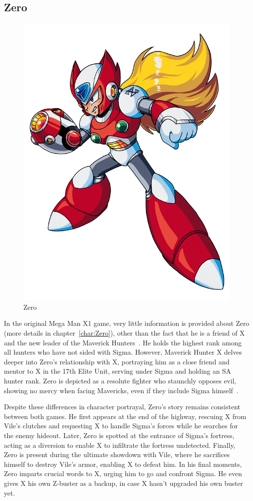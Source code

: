 \subsection{Zero}
\begin{figure}[htp]
	\centering
	\includegraphics[width=0.3\linewidth]{figures/X1/Zero_X1.png}
	\caption{Zero}
\end{figure}

In the original Mega Man X1 game, very little information is provided about Zero (more details in chapter~\ref{char:Zero}), other than the fact that he is a friend of X and the new leader of the Maverick Hunters~\cite{X:Manual}. He holds the highest rank among all hunters who have not sided with Sigma. However, Maverick Hunter X delves deeper into Zero's relationship with X, portraying him as a close friend and mentor to X in the 17th Elite Unit, serving under Sigma and holding an SA hunter rank. Zero is depicted as a resolute fighter who staunchly opposes evil, showing no mercy when facing Mavericks, even if they include Sigma himself~\cite{Xcoll1:Manual_X1}.

Despite these differences in character portrayal, Zero's story remains consistent between both games. He first appears at the end of the highway, rescuing X from Vile's clutches and requesting X to handle Sigma's forces while he searches for the enemy hideout. Later, Zero is spotted at the entrance of Sigma's fortress, acting as a diversion to enable X to infiltrate the fortress undetected. Finally, Zero is present during the ultimate showdown with Vile, where he sacrifices himself to destroy Vile's armor, enabling X to defeat him. In his final moments, Zero imparts crucial words to X, urging him to go and confront Sigma. He even gives X his own Z-buster as a backup, in case X hasn't upgraded his own buster yet.

